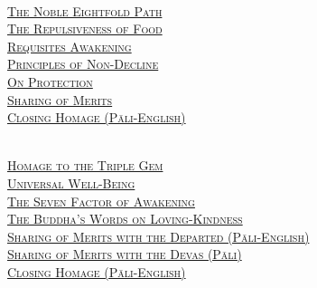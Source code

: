 {  \clearpage

  {\libertinusFont\selectfont\textbf{\textsc{\fontsize{18}{12}\selectfont{}}}}\\

  \textsc{\fontsize{14.4}{28}\selectfont
    \hyperref[noble-eightfold-path]{The Noble Eightfold Path} \ifdesktopversion\else\pageref{noble-eightfold-path}\fi\\
    \hyperref[repulsiveness-of-food]{The Repulsiveness of Food} \ifdesktopversion\else\pageref{repulsiveness-of-food}\fi\\
    \hyperref[requisites-for-awakening]{Requisites Awakening} \ifdesktopversion\else\pageref{requisites-for-awakening}\fi\\
    \hyperref[principles-of-non-decline]{Principles of Non-Decline} \ifdesktopversion\else\pageref{principles-of-non-decline}\fi\\
    \hyperref[protection]{On Protection} \ifdesktopversion\else\pageref{protection}\fi\\
    \hyperref[sharing-all-merits]{Sharing of Merits} \ifdesktopversion\else\pageref{sharing-all-merits}\fi\\
    \hyperref[closing-homage]{Closing Homage (Pāli-English)} \ifdesktopversion\else\pageref{closing-homage}\fi\\
  }

  \vspace{1.0cm}

  {\libertinusFont\selectfont\textbf{\textsc{\fontsize{18}{12}\selectfont{}}}}\\

  \textsc{\fontsize{14.4}{28}\selectfont
    \hyperref[dedication-of-offerings]{Homage to the Triple Gem} \ifdesktopversion\else\pageref{dedication-of-offerings}\fi\\
    \hyperref[universal-well-being]{Universal Well-Being} \ifdesktopversion\else\pageref{universal-well-being}\fi\\
    \hyperref[seven-factors-of-awakening]{The Seven Factor of Awakening} \ifdesktopversion\else\pageref{seven-factors-of-awakening}\fi\\
    \hyperref[words-on-loving-kindness]{The Buddha's Words on Loving-Kindness} \ifdesktopversion\else\pageref{words-on-loving-kindness}\fi\\
    \hyperref[sharing-merits-departed]{Sharing of Merits with the Departed (Pāli-English)} \ifdesktopversion\else\pageref{sharing-merits-departed}\fi\\
    \hyperref[sharing-merits-devas]{Sharing of Merits with the Devas (Pāli)} \ifdesktopversion\else\pageref{sharing-merits-devas}\fi\\
    \hyperref[closing-homage]{Closing Homage (Pāli-English)} \ifdesktopversion\else\pageref{closing-homage}\fi\\
  }

}
